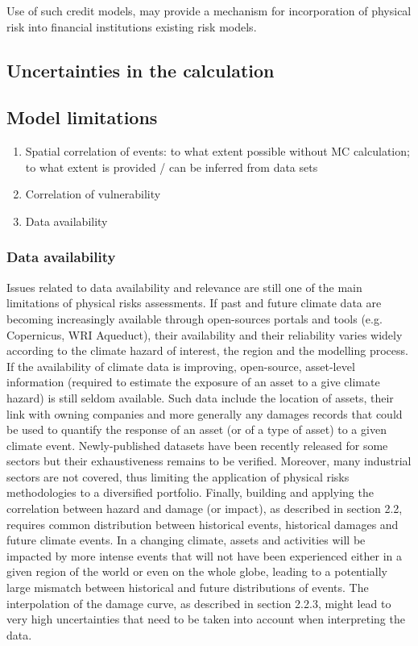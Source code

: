 \documentclass[a4paper,11pt]{extarticle} %
\theoremstyle{definition}
\begin{document}
Use of such credit models, may provide a mechanism for incorporation of physical risk into financial institutions existing risk models\cite{KenyonEtAl:2021}.

\subsection{Uncertainties in the calculation}

\subsection{Model limitations}

\begin{enumerate}
    \item Spatial correlation of events: to what extent possible without MC calculation; to what extent is provided / can be inferred from data sets
    \item Correlation of vulnerability
    \item Data availability
\end{enumerate}


\subsubsection{Data availability}
Issues related to data availability and relevance are still one of the main limitations of physical risks assessments. If past and future climate data are becoming increasingly available through open-sources portals and tools (e.g. Copernicus, WRI Aqueduct), their availability and their reliability varies widely according to the climate hazard of interest, the region and the modelling process. If the availability of climate data is improving, open-source, asset-level information (required to estimate the exposure of an asset to a give climate hazard) is still seldom available. Such data include the location of assets, their link with owning companies and more generally any damages records that could be used to quantify the response of an asset (or of a type of asset) to a given climate event. Newly-published datasets have been recently released for some sectors but their exhaustiveness remains to be verified. Moreover, many industrial sectors are not covered, thus limiting the application of physical risks methodologies to a diversified portfolio.
Finally, building and applying the correlation between hazard and damage (or impact), as described in section 2.2, requires common distribution between historical events, historical damages and future climate events. In a changing climate, assets and activities will be impacted by more intense events that will not have been experienced either in a given region of the world or even on the
whole globe, leading to a potentially large mismatch between historical and future distributions of events. The interpolation of the damage curve, as described in section 2.2.3, might lead to very high uncertainties that need to be taken into account when interpreting the data.
\end{document}
